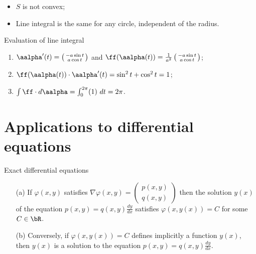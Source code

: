     \begin{itemize}
            \item \(S\) is not convex;
            \item Line integral is the same for any circle, independent of the radius.
        \end{itemize}

        
    {Evaluation of line integral}


        \begin{enumerate}
            \item \(\aalpha'(t) = \left(\begin{smallmatrix}
                -a \sin t \\ a \cos t
            \end{smallmatrix}\right)\) and \(\ff(\aalpha(t)) = \frac{1}{a^2} \left(\begin{smallmatrix}
                -a \sin t \\ a \cos t
            \end{smallmatrix}\right)   \);
            \item \(\ff(\aalpha(t)) \cdot \aalpha'(t) = \sin^2 t + \cos^2 t = 1  \);
            \item \(\int \ff \cdot d\aalpha = \int_{0}^{2\pi} (1) \ dt = 2\pi \).
        \end{enumerate}



\section{Applications to differential equations}



    {Exact  differential equations {}}

    \begin{theorem}
        \begin{enumerate}
            \item[(a)]         If \(\varphi(x,y)\) satisfies 
            \(\nabla \varphi(x,y) =   \left(\begin{smallmatrix}
                p(x,y) \\ q(x,y)
            \end{smallmatrix}\right)\) 
            then the solution \(y(x)\) of the equation \(p(x,y) = q(x,y) \frac{d y}{d x}\) satisfies \(\varphi(x,y(x))=C\) for some \(C\in \bR\).
            \item[(b)] Conversely, if  \(\varphi(x,y(x))=C\)  defines implicitly a function \(y(x)\), then \(y(x)\) is a solution to the equation  \(p(x,y) = q(x,y) \frac{d y}{d x}\).
        \end{enumerate}
    \end{theorem}

